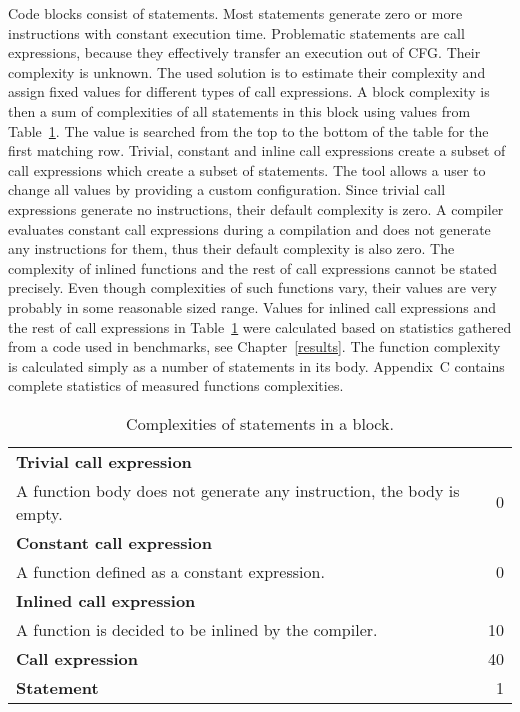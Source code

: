 Code blocks consist of statements. Most statements generate zero or more instructions with constant execution time. Problematic statements are call expressions, because they effectively transfer an execution out of CFG. Their complexity is unknown. The used solution is to estimate their complexity and assign fixed values for different types of call expressions. A block complexity is then a sum of complexities of all statements in this block using values from Table~\ref{yield-block}. The value is searched from the top to the bottom of the table for the first matching row. Trivial, constant and inline call expressions create a subset of call expressions which create a subset of statements. The tool allows a user to change all values by providing a custom configuration. Since trivial call expressions generate no instructions, their default complexity is zero. A compiler evaluates constant call expressions during a compilation and does not generate any instructions for them, thus their default complexity is also zero. The complexity of inlined functions and the rest of call expressions cannot be stated precisely. Even though complexities of such functions vary, their values are very probably in some reasonable sized range. Values for inlined call expressions and the rest of call expressions in Table~\ref{yield-block} were calculated based on statistics gathered from a code used in benchmarks, see Chapter~\ref{results}. The function complexity is calculated simply as a number of statements in its body. Appendix~C contains complete statistics of measured functions complexities.

\begin{table}[h!]
\caption{Complexities of statements in a block.}
\label{yield-block}
\vspace{0.1cm}
\renewcommand{\arraystretch}{1.1}
\centering
\begin{tabular}{ l | r }
  \textbf{Trivial call expression}\\A function body does not generate any instruction, the body is empty. & 0 \\
  \textbf{Constant call expression}\\A function defined as a constant expression. & 0 \\
  \textbf{Inlined call expression}\\A function is decided to be inlined by the compiler. & 10 \\
  \cellcolor[gray]{0.9}\textbf{Call expression} & \cellcolor[gray]{0.9}40 \\
  \cellcolor[gray]{0.75}\textbf{Statement} & \cellcolor[gray]{0.75}1 \\
\end{tabular}
\end{table}

